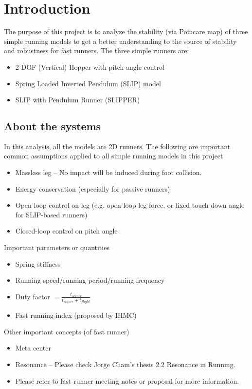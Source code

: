 \section{Introduction}
The purpose of this project is to analyze the stability (via Poincare map) of three simple running models to get a better understanding to the source of stability and robustness for fast runners. The three simple runners are:
	\begin{itemize}
	\item 2 DOF (Vertical) Hopper with pitch angle control
	\item Spring Loaded Inverted Pendulum (SLIP) model
	\item SLIP with Pendulum Runner (SLIPPER)
	\end{itemize}


\subsection{About the systems}
In this analysis, all the models are 2D runners.
The following are important common assumptions applied to all simple running models in this project
	\begin{itemize}
	\item Massless leg -- No impact will be induced during foot collision.
	\item Energy conservation (especially for passive runners)
	\item Open-loop control on leg (e.g. open-loop leg force, or fixed touch-down angle for SLIP-based runners)
	\item Closed-loop control on pitch angle
	\end{itemize}
 
 \noindent Important parameters or quantities

\begin{itemize}
	\item Spring stiffness
	\item Running speed/running period/running frequency
	\item Duty factor $= \frac{t_{stance}}{t_{stance}+t_{flight}}$	
	\item Fast running index (proposed by IHMC)
\end{itemize}

 \noindent Other important concepts (of fast runner)
\begin{itemize}
	\item Meta center
	\item Resonance -- Please check Jorge Cham's thesis \cite{Cham2002} 2.2 Resonance in Running.
	\item Please refer to fast runner meeting notes or proposal for more information.
\end{itemize}


